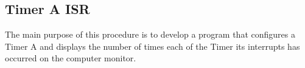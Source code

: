 \subsection{Timer A ISR}

The main purpose of this procedure is to develop a program that configures a Timer A and displays the number of times each of the Timer its interrupts has occurred on the computer monitor.

\cite{Digi_International_2007}\cite{Digi_International_Company_2011}